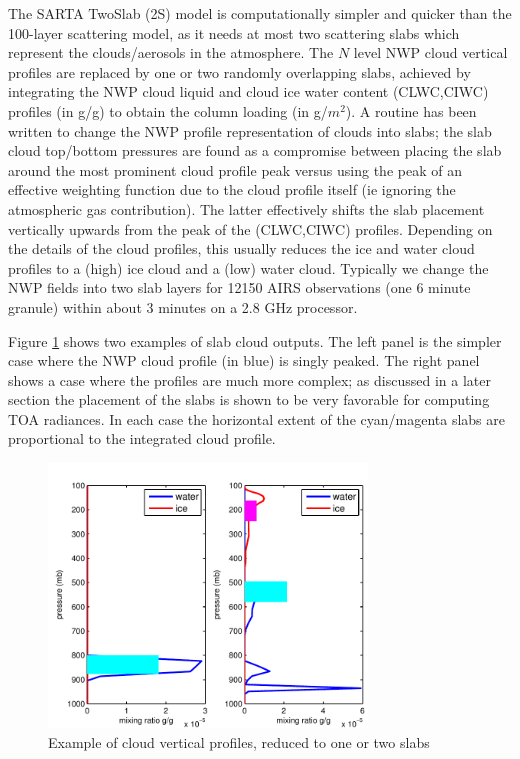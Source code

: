 \documentclass[agupp]{aguplus}              %
\begin{document}
\begin{article}
The SARTA TwoSlab (2S) model is computationally simpler and quicker
than the 100-layer scattering model, as it needs at most two
scattering slabs which represent the clouds/aerosols in the
atmosphere. The $N$ level NWP cloud vertical profiles
are replaced by one or two randomly overlapping slabs, achieved by
integrating the NWP cloud liquid and cloud ice water content
(CLWC,CIWC) profiles (in g/g) to obtain the column loading (in
g/$m^2$). A routine has been written to change the NWP profile
representation of clouds into slabs; the slab cloud top/bottom
pressures are found as a compromise between placing the slab around
the most prominent cloud profile peak versus using the peak of an
effective weighting function due to the cloud profile itself (ie
ignoring the atmospheric gas contribution). The latter effectively
shifts the slab placement vertically upwards from the peak of the
(CLWC,CIWC) profiles. Depending on the details of the cloud profiles,
this usually reduces the ice and water cloud profiles to a (high) ice
cloud and a (low) water cloud. Typically we change the NWP fields into
two slab layers for 12150 AIRS observations (one 6 minute granule)
within about 3 minutes on a 2.8 GHz processor.

Figure \ref{slab12} shows two examples of slab cloud
outputs.  The left panel is the simpler case where the NWP cloud
profile (in blue) is singly peaked. The right panel shows a case where
the profiles are much more complex; as discussed in a later section the
placement of the slabs is shown to be very favorable for computing TOA
radiances. In each case the horizontal extent of the cyan/magenta slabs
are proportional to the integrated cloud profile.

\begin{figure}[h]
\noindent\includegraphics[width=20pc]{FIGS/clouds_profileG040_271_321.pdf}
\caption{Example of cloud vertical profiles, reduced to one or two slabs}
\label{slab12}
\end{figure}


\end{article}
\end{document}
